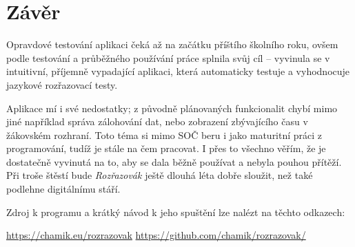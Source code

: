 \chapter*{Závěr}

Opravdové testování aplikaci čeká až na začátku příštího školního roku, ovšem podle testování a průběžného používání práce splnila svůj cíl -- vyvinula se v intuitivní, příjemně vypadající aplikaci, která automaticky testuje a vyhodnocuje jazykové rozřazovací testy. 

Aplikace mí i své nedostatky; z původně plánovaných funkcionalit chybí mimo jiné například správa zálohování dat, nebo zobrazení zbývajícího času v žákovském rozhraní. Toto téma si mimo SOČ beru i jako maturitní práci z programování, tudíž je stále na čem pracovat. I přes to všechno věřím, že je dostatečně vyvinutá na to, aby se dala běžně používat a nebyla pouhou přítěží. Při troše štěstí bude \textit{Rozřazovák} ještě dlouhá léta dobře sloužit, než také podlehne digitálnímu stáří.

Zdroj k programu a krátký návod k jeho spuštění lze nalézt na těchto odkazech:

\href{https://chamik.eu/rozrazovak}{https://chamik.eu/rozrazovak} \newline
\href{https://github.com/chamik/rozrazovak/}{https://github.com/chamik/rozrazovak/}